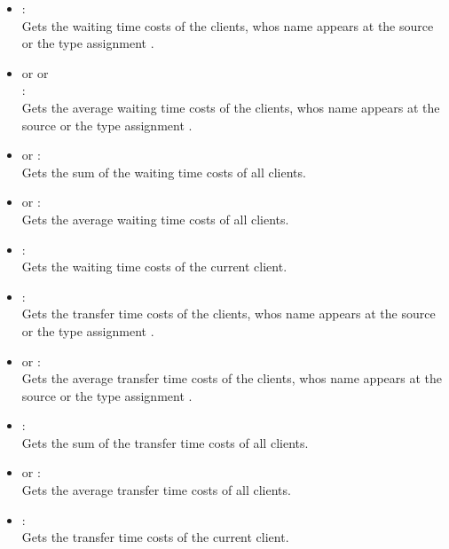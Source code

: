 \begin{itemize}

\item
{}:\\
Gets the waiting time costs of the clients, whos name appears at the source or the type assignment .  

\item
{} or  or\\
:\\
Gets the average waiting time costs of the clients, whos name appears at the source or the type assignment .

\item
{} or :\\
Gets the sum of the waiting time costs of all clients.

\item
{} or :\\
Gets the average waiting time costs of all clients.

\item
{}:\\
Gets the waiting time costs of the current client.

\item
{}:\\
Gets the transfer time costs of the clients, whos name appears at the source or the type assignment .

\item
{} or :\\
Gets the average transfer time costs of the clients, whos name appears at the source or the type assignment .

\item
{}:\\
Gets the sum of the transfer time costs of all clients.

\item
{} or :\\
Gets the average transfer time costs of all clients.

\item
{}:\\
Gets the transfer time costs of the current client.


\end{itemize}
